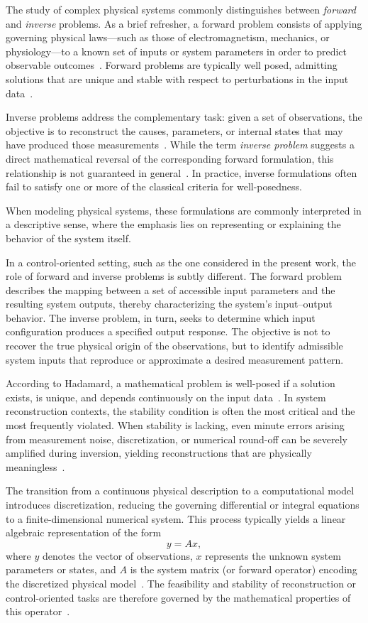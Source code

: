 The study of complex physical systems commonly distinguishes between \textit{forward}
and \textit{inverse} problems. As a brief refresher, a forward problem consists of applying
governing physical laws—such as those of electromagnetism, mechanics, or physiology—to
a known set of inputs or system parameters in order to predict observable outcomes~\cite{mueller-2012}. 
Forward problems are typically well posed, admitting solutions that
are unique and stable with respect to perturbations in the input data~\cite{burger}.

Inverse problems address the complementary task: given a set of observations, the objective
is to reconstruct the causes, parameters, or internal states that may have produced those
measurements~\cite{mueller-2012}. While the term \textit{inverse problem} suggests a direct
mathematical reversal of the corresponding forward formulation, this relationship is not
guaranteed in general~\cite{burger}. In practice, inverse formulations often fail to satisfy
one or more of the classical criteria for well-posedness.

When modeling physical systems, these formulations are commonly interpreted in a
descriptive sense, where the emphasis lies on representing or explaining the behavior of
the system itself.

In a control-oriented setting, such as the one considered in the present work, the role of
forward and inverse problems is subtly different. The forward problem describes the
mapping between a set of accessible input parameters and the resulting system outputs,
thereby characterizing the system’s input–output behavior. The inverse problem, in turn,
seeks to determine which input configuration produces a specified output response. The
objective is not to recover the true physical origin of the observations, but to identify
admissible system inputs that reproduce or approximate a desired measurement pattern.

According to Hadamard, a mathematical problem is well-posed if a solution exists, is unique, and depends continuously on the input data~\cite{burger}. In system reconstruction contexts, the stability condition is often the most critical and the most frequently violated. When stability is lacking, even minute errors arising from measurement noise, discretization, or numerical round-off can be severely amplified during inversion, yielding reconstructions that are physically meaningless~\cite{burger}.

The transition from a continuous physical description to a computational model introduces discretization, reducing the governing differential or integral equations to a finite-dimensional numerical system. This process typically yields a linear algebraic representation of the form
\[
y = Ax,
\]
where $y$ denotes the vector of observations, $x$ represents the unknown system parameters or states, and $A$ is the system matrix (or forward operator) encoding the discretized physical model~\cite{mueller-2012}. The feasibility and stability of reconstruction or control-oriented tasks are therefore governed by the mathematical properties of this operator~\cite{mueller-2012, burger}.

